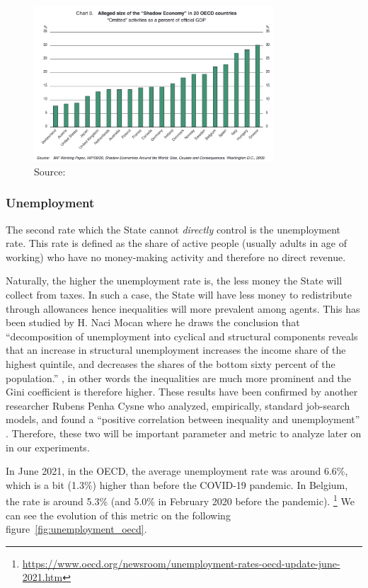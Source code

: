     \begin{figure}[H]
        \centering
        \includegraphics[width=0.8\textwidth]{img/black economy OECD.png}
        \caption{Source: \cite{oecdBlack}}
        \label{fig:black_economy_oecd}
    \end{figure}

    \subsubsection{Unemployment}
    The second rate which the State cannot \emph{directly} control is the unemployment rate. This rate is defined as the share of active people (usually adults in age of working) who have no money-making activity and therefore no direct revenue. 

    Naturally, the higher the unemployment rate is, the less money the State will collect from taxes. In such a case, the State will have less money to redistribute through allowances hence inequalities will more prevalent among agents. This has been studied by H. Naci Mocan where he draws the conclusion that ``decomposition  of  unemployment  into  cyclical  and  structural  components  reveals  that  an  increase  in  structural unemployment  increases  the  income  share  of  the  highest quintile, and decreases the shares of the bottom sixty percent of the population.'' \cite{Unemployment1}, in other words the inequalities are much more prominent and the Gini coefficient is therefore higher. These results have been confirmed by another researcher Rubens Penha Cysne who analyzed, empirically, standard job-search models, and found a ``positive correlation between inequality and unemployment'' \cite{Unemployment2}. Therefore, these two will be important parameter and metric to analyze later on in our experiments.

    In June 2021, in the OECD, the average unemployment rate was around 6.6\%, which is a bit (1.3\%) higher than before the COVID-19 pandemic. In Belgium, the rate is around 5.3\% (and 5.0\% in February 2020 before the pandemic).
    \footnote{\url{https://www.oecd.org/newsroom/unemployment-rates-oecd-update-june-2021.htm}} We can see the evolution of this metric on the following figure~\ref{fig:unemployment_oecd}.
    
